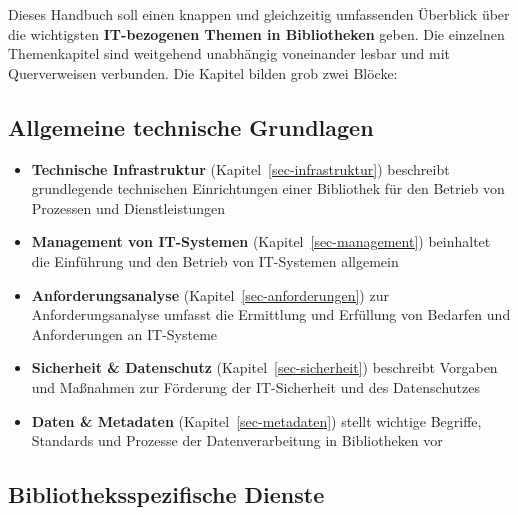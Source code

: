 \documentclass[
  11pt,
  letterpaper,
  DIV=11,
  twoside]{scrreprt}
\begin{document}
Dieses Handbuch soll einen knappen und gleichzeitig umfassenden
Überblick über die wichtigsten \textbf{IT-bezogenen Themen in
Bibliotheken} geben. Die einzelnen Themenkapitel sind weitgehend
unabhängig voneinander lesbar und mit Querverweisen verbunden. Die
Kapitel bilden grob zwei Blöcke:

\subsection{Allgemeine technische
Grundlagen}\label{allgemeine-technische-grundlagen}

\begin{itemize}
\item
  \textbf{Technische Infrastruktur} (Kapitel~\ref{sec-infrastruktur})
  beschreibt grundlegende technischen Einrichtungen einer Bibliothek für
  den Betrieb von Prozessen und Dienstleistungen
\item
  \textbf{Management von IT-Systemen} (Kapitel~\ref{sec-management})
  beinhaltet die Einführung und den Betrieb von IT-Systemen allgemein
\item
  \textbf{Anforderungsanalyse} (Kapitel~\ref{sec-anforderungen}) zur
  Anforderungsanalyse umfasst die Ermittlung und Erfüllung von Bedarfen
  und Anforderungen an IT-Systeme
\item
  \textbf{Sicherheit \& Datenschutz} (Kapitel~\ref{sec-sicherheit})
  beschreibt Vorgaben und Maßnahmen zur Förderung der IT-Sicherheit und
  des Datenschutzes
\item
  \textbf{Daten \& Metadaten} (Kapitel~\ref{sec-metadaten}) stellt
  wichtige Begriffe, Standards und Prozesse der Datenverarbeitung in
  Bibliotheken vor
\end{itemize}

\subsection{Bibliotheksspezifische
Dienste}\label{bibliotheksspezifische-dienste}
\end{document}
